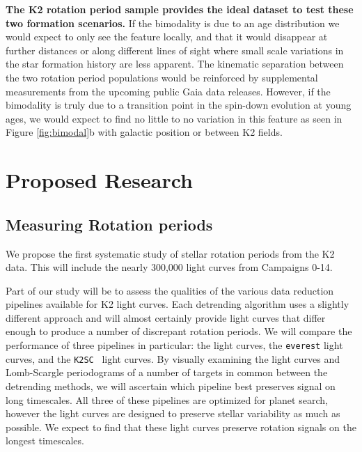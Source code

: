 \documentclass[12pt]{article}
\newcommand{\racomment}[1]{{\color{red}#1}}
\newcommand{\ktwosc}{{\tt K2SC}}
\begin{document}
{\bf The K2 rotation period sample provides the ideal dataset to test these two formation scenarios.} If the bimodality is due to an age distribution we would expect to only see the feature locally, and that it would disappear at further distances or along different lines of sight where small scale variations in the star formation history are less apparent. The kinematic separation between the two rotation period populations would be reinforced by supplemental measurements from the upcoming public Gaia data releases. However, if the bimodality is truly due to a transition point in the spin-down evolution at young ages, we would expect to find no little to no variation in this feature as seen in Figure \ref{fig:bimodal}b with galactic position or between K2 fields.






\section{Proposed Research}
\subsection{Measuring Rotation periods}
We propose the first systematic study of stellar rotation periods from the K2
data. This will include the nearly 300,000 light curves from Campaigns 0-14.

Part of our study will be to assess the qualities of the various data
reduction pipelines available for K2 light curves.
Each detrending algorithm uses a slightly different approach and will almost
certainly provide light curves that differ enough to produce a number of
discrepant rotation periods.
We will compare the performance of three pipelines in particular: the
\citet{Vanderburg2015} light curves, the {\tt everest} \citet{luger2016} light
curves, and the \ktwosc\ \citet{aigrain2016} light curves.
By visually examining the light curves and Lomb-Scargle periodograms of a
number of targets in common between the detrending methods, we will ascertain
which pipeline best preserves signal on long timescales.
All three of these pipelines are optimized for planet search, however the
\citet{aigrain2016} light curves are designed to preserve stellar variability
as much as possible.
We expect to find that these light curves preserve rotation signals on the
longest timescales.
\end{document}

